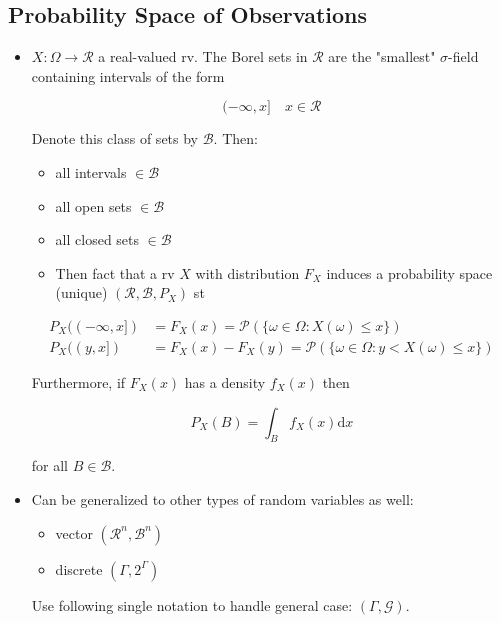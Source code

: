 \documentclass[12pt,thmsa]{article}
\begin{document}
\subsection{Probability Space of Observations}
\begin{itemize}
	\item $X: \Omega \rightarrow \mathcal{R}$ a real-valued rv. The Borel sets in $\mathcal{R}$ are the "smallest" $\sigma$-field containing intervals of the form

	$$
	(-\infty, x] \quad x \in \mathcal{R}
	$$

	Denote this class of sets by $\mathcal{B}$. Then:

	\begin{itemize}
		\item all intervals $\in \mathcal{B}$
		\item all open sets $\in \mathcal{B}$
		\item all closed sets $\in \mathcal{B}$
		\item Then fact that a rv $X$ with distribution $F_{X}$ induces a probability space (unique) $\left(\mathcal{R}, \mathcal{B}, P_{X}\right)$ st
	\end{itemize}

	$$
	\begin{aligned}
		P_{X}((-\infty, x]) & =F_{X}(x)=\mathcal{P}(\{\omega \in \Omega: X(\omega) \leq x\}) \\
		P_{X}((y, x]) & =F_{X}(x)-F_{X}(y)=\mathcal{P}(\{\omega \in \Omega: y<X(\omega) \leq x\})
	\end{aligned}
	$$

	Furthermore, if $F_{X}(x)$ has a density $f_{X}(x)$ then
	
	$$
	P_{X}(B)=\int_{B} f_{X}(x) \mathrm{d} x
	$$
	
	for all $B \in \mathcal{B}$.

	\item Can be generalized to other types of random variables as well:
	
	\begin{itemize}
		\item vector $\left(\mathcal{R}^{n}, \mathcal{B}^{n}\right)$
		
		\item discrete $\left(\Gamma, 2^{\Gamma}\right)$
	
	\end{itemize}
	
	Use following single notation to handle general case: $(\Gamma, \mathcal{G})$.
\end{itemize}
\end{document}
